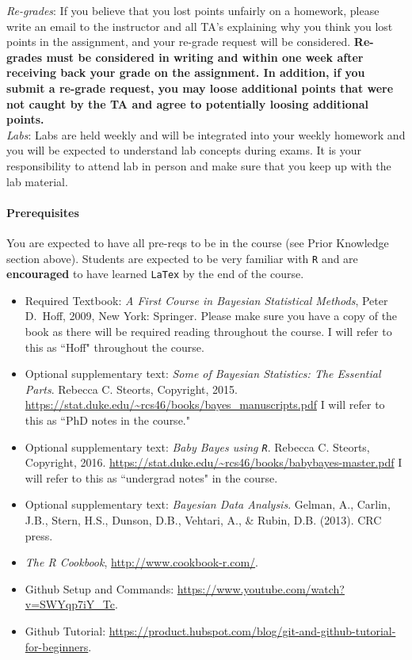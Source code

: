 \documentclass[11pt]{article}
\begin{document}
\emph{Re-grades}: If you believe that you lost points unfairly on a homework, please write an email to the instructor and all TA's explaining why you think you lost points in the assignment, and your re-grade request will be considered. \textbf{Re-grades must be considered in writing and within one week after receiving back your grade on the assignment. In addition, if you submit a re-grade request, you may loose additional points that were not caught by the TA and agree to potentially loosing additional points.} \\

\emph{Labs}: Labs are held weekly and will be integrated into your weekly homework and you will be expected to understand lab concepts during exams. It is your responsibility to attend lab in person and make sure that you keep up with the lab material. 


\paragraph{Prerequisites}

You are expected to have all pre-reqs to be in the course (see Prior Knowledge section above). Students are expected to be very familiar with \texttt{R} and are \textbf{encouraged} to have learned \texttt{LaTex} by the end of the course. 

\begin{itemize}
\item[] Required Textbook: \textit{A First Course in Bayesian Statistical Methods}, Peter D.\ Hoff, 2009, New York: Springer. Please make sure you have a copy of the book as there will be required reading throughout the course. I will refer to this as ``Hoff" throughout the course. 
\item[] Optional supplementary text:  \textit{Some of Bayesian Statistics: The Essential Parts}. Rebecca C. Steorts, Copyright, 2015. \url{https://stat.duke.edu/~rcs46/books/bayes_manuscripts.pdf} I will refer to this as ``PhD notes in the course."
\item[] Optional supplementary text:  \textit{Baby Bayes using \texttt{R}}. Rebecca C. Steorts, Copyright, 2016. 
\url{https://stat.duke.edu/~rcs46/books/babybayes-master.pdf} I will refer to this as ``undergrad notes" in the course. 
\item[] Optional supplementary text:  \textit{Bayesian Data Analysis}. Gelman, A., Carlin, J.B., Stern, H.S., Dunson, D.B., Vehtari, A., \& Rubin, D.B. (2013). CRC press.
\item[] \emph{The R Cookbook}, \url{http://www.cookbook-r.com/}.
\item[] Github Setup and Commands: \url{https://www.youtube.com/watch?v=SWYqp7iY_Tc}.
\item[] Github Tutorial: \url{https://product.hubspot.com/blog/git-and-github-tutorial-for-beginners}.

\end{itemize}
\end{document}
